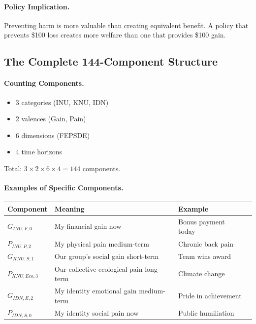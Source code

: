 \documentclass[12pt,a4paper]{article}
\begin{document}
\paragraph{Policy Implication.}
Preventing harm is more valuable than creating equivalent benefit.
A policy that prevents \$100 loss creates more welfare than one that provides \$100 gain.

\subsection{The Complete 144-Component Structure}

\paragraph{Counting Components.}
\begin{itemize}
  \item 3 categories (INU, KNU, IDN)
  \item 2 valences (Gain, Pain)
  \item 6 dimensions (FEPSDE)
  \item 4 time horizons
\end{itemize}

Total: $3 \times 2 \times 6 \times 4 = 144$ components.

\paragraph{Examples of Specific Components.}

\begin{center}
\renewcommand{\arraystretch}{1.2}
\begin{tabular}{llll}
\hline
\textbf{Component} & \textbf{Meaning} & \textbf{Example} \\
\hline
$G_{INU,F,0}$ & My financial gain now & Bonus payment today \\
$P_{INU,P,2}$ & My physical pain medium-term & Chronic back pain \\
$G_{KNU,S,1}$ & Our group's social gain short-term & Team wins award \\
$P_{KNU,Eco,3}$ & Our collective ecological pain long-term & Climate change \\
$G_{IDN,E,2}$ & My identity emotional gain medium-term & Pride in achievement \\
$P_{IDN,S,0}$ & My identity social pain now & Public humiliation \\
\hline
\end{tabular}
\end{center}
\end{document}
